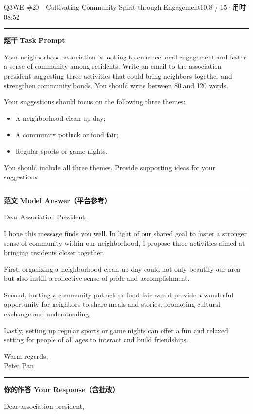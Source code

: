 \documentclass[11pt]{article}
\newcommand{\ptesub}[1]{%
  \par\needspace{2\baselineskip}\smallskip
  {\color{cAccent}\rule[-0.2ex]{3pt}{1.05em}}\hspace{6pt}%
  {\bfseries\color{cHead}#1}\par\nopagebreak\smallskip}
\begin{document}
\begin{qblock}{Q3\quad WE \#20\ \ Cultivating Community Spirit through Engagement}{10.8 / 15\quad·\quad 用时 08:52}

\ptesub{题干 Task Prompt}
\begin{promptbox}
Your neighborhood association is looking to enhance local engagement and foster a sense of community among residents. Write an email to the association president suggesting three activities that could bring neighbors together and strengthen community bonds. You should write between 80 and 120 words.

\smallskip Your suggestions should focus on the following three themes:
\begin{itemize}[leftmargin=1.4em,topsep=2pt,itemsep=0pt]
  \item A neighborhood clean-up day;
  \item A community potluck or food fair;
  \item Regular sports or game nights.
\end{itemize}
You should include all three themes. Provide supporting ideas for your suggestions.
\end{promptbox}

\ptesub{范文 Model Answer（平台参考）}
\begin{modelbox}
Dear Association President,

I hope this message finds you well. In light of our shared goal to foster a stronger sense of community within our neighborhood, I propose three activities aimed at bringing residents closer together.

First, organizing a neighborhood clean-up day could not only beautify our area but also instill a collective sense of pride and accomplishment.

Second, hosting a community potluck or food fair would provide a wonderful opportunity for neighbors to share meals and stories, promoting cultural exchange and understanding.

Lastly, setting up regular sports or game nights can offer a fun and relaxed setting for people of all ages to interact and build friendships.

Warm regards,\\ Peter Pan
\end{modelbox}

\ptesub{你的作答 Your Response（含批改）}
\begin{youbox}
Dear association president,


\end{youbox}
\end{qblock}
\end{document}

